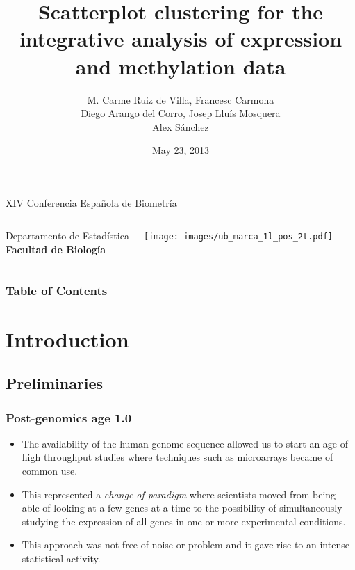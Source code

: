 \documentclass[handout]{beamer}
\title[Scatterplot clustering]{Scatterplot clustering for the integrative analysis of expression and methylation data}
\author[Ruiz de Villa]{M. Carme Ruiz de Villa, Francesc Carmona \\ Diego Arango del Corro, Josep Lluís Mosquera 
\\ Alex Sánchez}
\date[2013-05-23]{May 23, 2013}
\begin{document}
\begin{frame}
\begin{scriptsize}
\begin{center}
   XIV Conferencia Española de Biometría
\end{center}
\end{scriptsize}

\titlepage

\begin{columns}
   \scriptsize
   Departamento de Estadística \\ \textbf{Facultad de Biología}
    
   \hfill{}
   \texttt{[image: images/ub\_marca\_1l\_pos\_2t.pdf]}
\end{columns}
\end{frame}


\begin{frame}
\frametitle{Table of Contents}
\tableofcontents
\end{frame}

\section{Introduction}

\subsection{Preliminaries}

\label{sec-1}
\begin{frame}
\frametitle{Post-genomics age 1.0}
\label{sec-1-1}
\begin{itemize}

\item The availability of the human genome sequence allowed us to
  start an age of high throughput studies where techniques such as
  microarrays became of common use.
\label{sec-1-1-1}%

\item This represented a \emph{change of paradigm} where scientists
  moved from being able of looking at a few genes at a time to the
  possibility of simultaneously studying the expression of all genes
  in one or more experimental conditions.
\label{sec-1-1-2}%

\item This approach was not free of noise or problem and it gave rise
  to an intense statistical activity.
\label{sec-1-1-3}%

\end{itemize} %
\end{frame}
\end{document}
